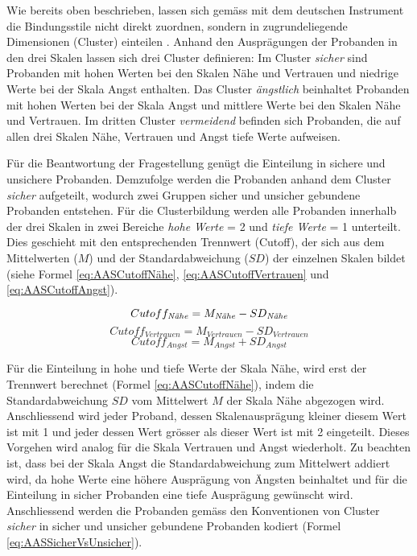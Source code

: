 Wie bereits oben beschrieben, lassen sich gemäss  mit dem deutschen Instrument die Bindungsstile nicht direkt zuordnen, sondern in zugrundeliegende Dimensionen (Cluster) einteilen \cite{Schuetzmann2004}. Anhand den Ausprägungen der Probanden in den drei Skalen lassen sich drei Cluster definieren: Im Cluster \textit{sicher} sind Probanden mit hohen Werten bei den Skalen Nähe und Vertrauen und niedrige Werte bei der Skala Angst enthalten. Das Cluster \textit{ängstlich} beinhaltet Probanden mit hohen Werten bei der Skala Angst und mittlere Werte bei den Skalen Nähe und Vertrauen. Im dritten Cluster \textit{vermeidend} befinden sich Probanden, die auf allen drei Skalen Nähe, Vertrauen und Angst tiefe Werte aufweisen.

Für die Beantwortung der Fragestellung genügt die Einteilung in sichere und unsichere Probanden. Demzufolge werden die Probanden anhand dem Cluster \textit{sicher} aufgeteilt, wodurch zwei Gruppen sicher und unsicher gebundene Probanden entstehen. 
Für die Clusterbildung werden alle Probanden innerhalb der drei Skalen in zwei Bereiche \textit{hohe Werte} = 2 und \textit{tiefe Werte} = 1 unterteilt. Dies geschieht mit den entsprechenden Trennwert (Cutoff), der sich aus dem Mittelwerten ($M$) und der Standardabweichung ($SD$) der einzelnen Skalen bildet (siehe Formel \ref{eq:AASCutoffNähe}, \ref{eq:AASCutoffVertrauen} und \ref{eq:AASCutoffAngst}). 

\begin{equation}\label{eq:AASCutoffNähe}
    Cutoff_{\text{\textit{N{\"a}he}}}=M_{\text{\textit{N{\"a}he}}} - SD_{\text{\textit{N{\"a}he}}}
\end{equation}
\begin{equation}\label{eq:AASCutoffVertrauen}
    Cutoff_{Vertrauen}=M_{Vertrauen} - SD_{Vertrauen}
\end{equation}
\begin{equation}\label{eq:AASCutoffAngst}
    Cutoff_{Angst}=M_{Angst} + SD_{Angst}
\end{equation}

Für die Einteilung in hohe und tiefe Werte der Skala Nähe, wird erst der Trennwert berechnet (Formel \ref{eq:AASCutoffNähe}), indem die Standardabweichung $SD$ vom Mittelwert $M$ der Skala Nähe abgezogen wird. Anschliessend wird jeder Proband, dessen Skalenausprägung kleiner diesem Wert ist mit 1 und jeder dessen Wert grösser als dieser Wert ist mit 2 eingeteilt. Dieses Vorgehen wird analog für die Skala Vertrauen und Angst wiederholt. Zu beachten ist, dass bei der Skala Angst die Standardabweichung zum Mittelwert addiert wird, da hohe Werte eine höhere Ausprägung von Ängsten beinhaltet und für die Einteilung in sicher Probanden eine tiefe Ausprägung gewünscht wird. Anschliessend werden die Probanden gemäss den Konventionen von Cluster \textit{sicher} in sicher und unsicher gebundene Probanden kodiert (Formel \ref{eq:AASSicherVsUnsicher}).

